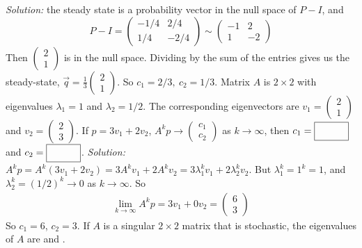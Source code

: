 \begin{parts}
        \ifnum {} {\color{DarkBlue} \textit{Solution:} the steady state is a probability vector in the null space of $P-I$, and $$P-I = \begin{pmatrix} -1/4&2/4\\1/4&-2/4 \end{pmatrix} \sim \begin{pmatrix} -1&2\\1&-2\end{pmatrix}$$ Then $\begin{pmatrix} 2\\1\end{pmatrix}$ is in the null space. Dividing by the sum of the entries gives us the steady-state, $\vec q = \frac13 \begin{pmatrix} 2\\1\end{pmatrix}$. So $c_1 = 2/3, \ c_2 = 1/3$. } \fi    
    \fi 
    \ifnum {}
        Matrix $A$ is $2\times 2$ with eigenvalues $\lambda_1 = 1$ and $\lambda_2= 1/2$. The corresponding eigenvectors are $v_1 = \begin{pmatrix} 2\\1\end{pmatrix}$ and $v_2=\begin{pmatrix} 2\\3\end{pmatrix}$. If $ p = 3v_1+2v_2$, $A^kp \to \begin{pmatrix} c_1 \\ c_2 \end{pmatrix}$ as $k\to \infty$, then $c_1 = \framebox{\strut\hspace{1cm}}$ and $c_2 = \framebox{\strut\hspace{1cm}}$. 
        \ifnum {} {\color{DarkBlue} \textit{Solution:} $A^kp = A^k(3v_1 + 2v_2) = 3A^kv_1 + 2A^kv_2 = 3\lambda_1^kv_1 + 2\lambda_2^kv_2$. But $\lambda_1^k =1^k = 1$, and $\lambda_2^k = (1/2)^k\to 0$ as $k\to \infty$. So \begin{align}
            \lim_{k \to \infty} A^kp = 3v_1 + 0v_2 = \begin{pmatrix} 6\\3\end{pmatrix}
        \end{align} So $c_1 = 6$, $c_2 = 3$. } \fi    
    \fi 
    \ifnum {}
        If $A$ is a singular $2\times 2$ matrix that is stochastic, the eigenvalues of $A$ are \framebox{\strut\hspace{1cm}} and \framebox{\strut\hspace{1cm}}. 

\end{parts}

